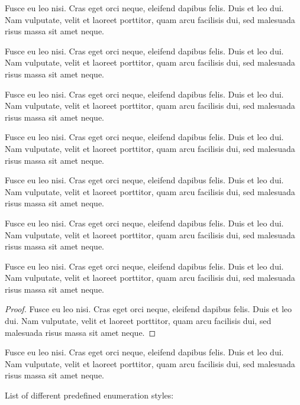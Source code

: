 \documentclass[a4paper ,UKenglish  ,cleveref ,autoref ,thm-restate   ]{lipics-v2019}
\begin{document}
\begin{example}\label{testenv-example}
Fusce eu leo nisi. Cras eget orci neque, eleifend dapibus felis. Duis et leo dui. Nam vulputate, velit et laoreet porttitor, quam arcu facilisis dui, sed malesuada risus massa sit amet neque.
\end{example}

\begin{note}\label{testenv-note}
Fusce eu leo nisi. Cras eget orci neque, eleifend dapibus felis. Duis et leo dui. Nam vulputate, velit et laoreet porttitor, quam arcu facilisis dui, sed malesuada risus massa sit amet neque.
\end{note}

\begin{note*}
Fusce eu leo nisi. Cras eget orci neque, eleifend dapibus felis. Duis et leo dui. Nam vulputate, velit et laoreet porttitor, quam arcu facilisis dui, sed malesuada risus massa sit amet neque.
\end{note*}

\begin{remark}\label{testenv-remark}
Fusce eu leo nisi. Cras eget orci neque, eleifend dapibus felis. Duis et leo dui. Nam vulputate, velit et laoreet porttitor, quam arcu facilisis dui, sed malesuada risus massa sit amet neque.
\end{remark}

\begin{remark*}
Fusce eu leo nisi. Cras eget orci neque, eleifend dapibus felis. Duis et leo dui. Nam vulputate, velit et laoreet porttitor, quam arcu facilisis dui, sed malesuada risus massa sit amet neque.
\end{remark*}

\begin{claim}\label{testenv-claim}
Fusce eu leo nisi. Cras eget orci neque, eleifend dapibus felis. Duis et leo dui. Nam vulputate, velit et laoreet porttitor, quam arcu facilisis dui, sed malesuada risus massa sit amet neque.
\end{claim}

\begin{claim*}\label{testenv-claim2}
Fusce eu leo nisi. Cras eget orci neque, eleifend dapibus felis. Duis et leo dui. Nam vulputate, velit et laoreet porttitor, quam arcu facilisis dui, sed malesuada risus massa sit amet neque.
\end{claim*}

\begin{proof}
Fusce eu leo nisi. Cras eget orci neque, eleifend dapibus felis. Duis et leo dui. Nam vulputate, velit et laoreet porttitor, quam arcu facilisis dui, sed malesuada risus massa sit amet neque.
\end{proof}

\begin{claimproof}
Fusce eu leo nisi. Cras eget orci neque, eleifend dapibus felis. Duis et leo dui. Nam vulputate, velit et laoreet porttitor, quam arcu facilisis dui, sed malesuada risus massa sit amet neque.
\end{claimproof}

List of different predefined enumeration styles:
\end{document}
